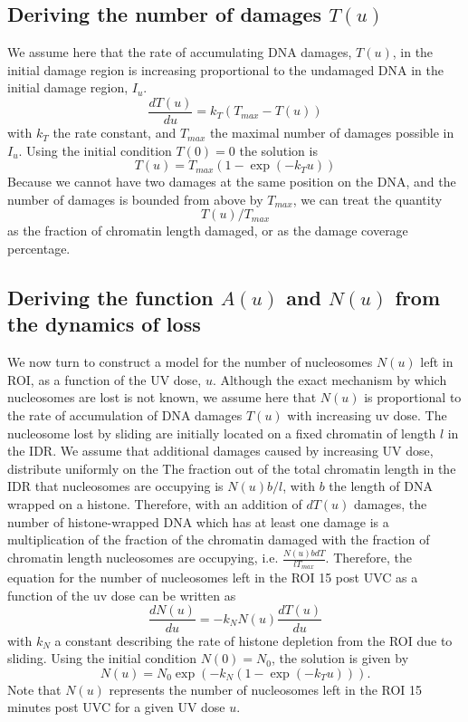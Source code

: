 \documentclass[12pt]{article}
\begin{document}
\subsection{Deriving the number of damages $T(u)$}
We assume here that the rate of accumulating DNA damages, $T(u)$, in the initial damage region is increasing proportional to the undamaged DNA in the initial damage region, $I_u$.
\begin{equation}
\frac{dT(u)}{du}=k_T\left(T_{max}-T(u)\right)
\end{equation}
with $k_T$ the rate constant, and $T_{max}$ the maximal number of damages possible in $I_u$. 
Using the initial condition $T(0) = 0$ the solution is
\begin{equation}
T(u) = T_{max}\left(1-\exp(-k_T u)\right) 
\end{equation}
Because we cannot have two damages at the same position on the DNA, and the number of damages is bounded from above by $T_{max}$, we can treat the quantity 
\begin{equation*}
T(u)/T_{max}
\end{equation*}
as the fraction of chromatin length damaged, or as the damage coverage percentage. 

\subsection{Deriving the function $A(u)$ and $N(u)$ from the dynamics of loss}
We now turn to construct a model for the number of nucleosomes $N(u)$ left in ROI, as a function of the UV dose, $u$. Although the exact mechanism by which nucleosomes are lost is not known, we assume here that $N(u)$ is proportional to the rate of accumulation of DNA damages $T(u)$ with increasing uv dose. The nucleosome lost by sliding are initially located on a fixed chromatin of length $l$ in the IDR. We assume that additional damages caused by increasing UV dose, distribute uniformly on the  The fraction out of the total chromatin length in the IDR that nucleosomes are occupying is $N(u)b/l$, with $b$ the length of DNA wrapped on a histone. Therefore, with an addition of $dT(u)$ damages, the number of histone-wrapped DNA which has at least one damage is a multiplication of the fraction of the chromatin damaged with the fraction of chromatin length nucleosomes are occupying, i.e. $ \frac{N(u)bdT}{lT_{max}} $. Therefore, the equation for the number of nucleosomes left in the ROI 15 post UVC as a function of the uv dose can be written as
\begin{equation*}
\frac{dN(u)}{du} = -k_NN(u)\frac{dT(u)}{du}
\end{equation*}
with $k_N$ a constant describing the rate of histone depletion from the ROI due to sliding. Using the initial condition $N(0) = N_0$, the solution is given by
\begin{equation}\label{eq:NumHistones}
N(u) = N_0\exp\left(-k_N\left(1-\exp(-k_Tu)\right)\right).
\end{equation}
Note that $N(u)$ represents the number of nucleosomes left in the ROI 15 minutes post UVC for a given UV dose $u$.
\end{document}
